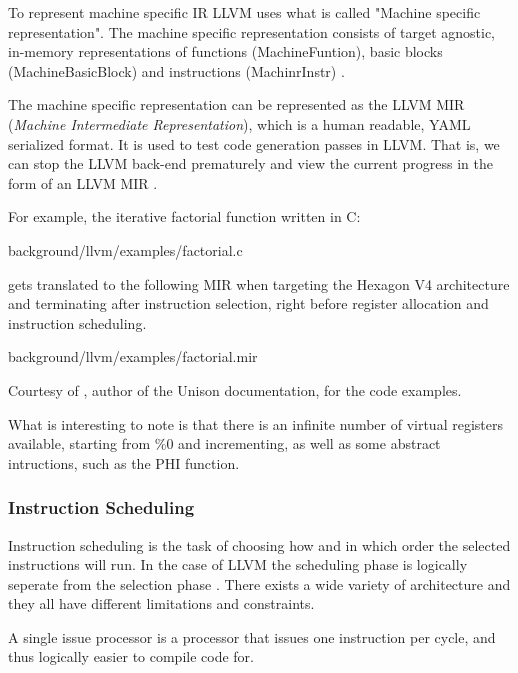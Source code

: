 To represent machine specific IR LLVM uses what is called "Machine specific representation".
The machine specific representation consists of target agnostic, in-memory representations
of functions (MachineFuntion), basic blocks (MachineBasicBlock) and instructions
(MachinrInstr) \cite{llvm-mir-lang-ref, llvm-codegenerator-machinecode}.

The machine specific representation can be represented as the LLVM MIR (\textit{Machine
Intermediate Representation}), which is a human readable, YAML serialized format. It is
used to test code generation passes in LLVM. That is, we can stop the LLVM back-end
prematurely and view the current progress in the form of an LLVM MIR
\cite{llvm-mir-lang-ref}.

For example, the iterative factorial function written in C:


{background/llvm/examples/factorial.c}

gets translated to the following MIR when targeting the Hexagon V4 architecture and
terminating after instruction selection, right before register allocation and instruction
scheduling.


{background/llvm/examples/factorial.mir}

Courtesy of \textcite{unison-docs-examples}, author of the Unison documentation, for the code examples.

What is interesting to note is that there is an infinite number of virtual registers available,
starting from \%0 and incrementing, as well as some abstract intructions, such as the PHI
function.

\subsubsection{Instruction Scheduling}
Instruction scheduling is the task of choosing how and in which order the selected instructions
will run. In the case of LLVM the scheduling phase is logically seperate from the selection
phase \cite{llvm-codegenerator-scheduling}. There exists a wide variety of architecture
and they all have different limitations and constraints.

A single issue processor is a processor that issues one instruction per cycle, and thus
logically easier to compile code for.

